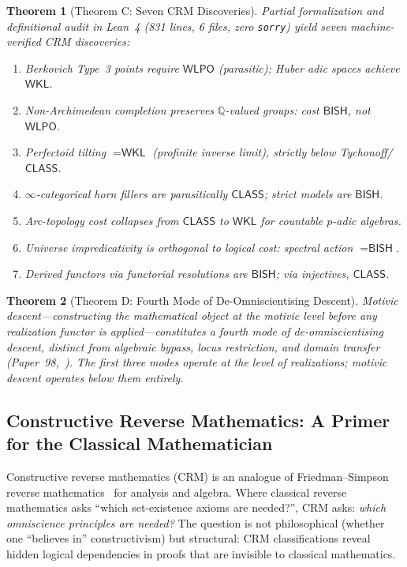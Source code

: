\documentclass[11pt,a4paper]{article}
\theoremstyle{plain}
\newtheorem{theorem}{Theorem}[section]
\theoremstyle{definition}
\newcommand{\BISH}{\textsf{BISH}}
\newcommand{\WKL}{\textsf{WKL}}
\newcommand{\WLPO}{\textsf{WLPO}}
\newcommand{\CLASS}{\textsf{CLASS}}
\newcommand{\Q}{\mathbb{Q}}
\begin{document}
\begin{theorem}[Theorem C: Seven CRM Discoveries]\label{thm:C}
Partial formalization and definitional audit in Lean~4 (831 lines, 6 files, zero \texttt{sorry}) yield seven machine-verified CRM discoveries:
\begin{enumerate}[label=(\arabic*)]
\item Berkovich Type~3 points require $\WLPO$ (parasitic); Huber adic spaces achieve $\WKL$.
\item Non-Archimedean completion preserves $\Q$-valued groups: cost $\BISH$, not $\WLPO$.
\item Perfectoid tilting $= \WKL$ (profinite inverse limit), strictly below Tychonoff/$\CLASS$.
\item $\infty$-categorical horn fillers are parasitically $\CLASS$; strict models are $\BISH$.
\item Arc-topology cost collapses from $\CLASS$ to $\WKL$ for countable $p$-adic algebras.
\item Universe impredicativity is orthogonal to logical cost: spectral action $= \BISH$.
\item Derived functors via functorial resolutions are $\BISH$; via injectives, $\CLASS$.
\end{enumerate}
\end{theorem}

\begin{theorem}[Theorem D: Fourth Mode of De-Omniscientising Descent]\label{thm:D}
Motivic descent---constructing the mathematical object at the motivic level before any realization functor is applied---constitutes a fourth mode of de-omniscientising descent, distinct from algebraic bypass, locus restriction, and domain transfer (Paper~98,~\cite{lee-p98}). The first three modes operate at the level of realizations; motivic descent operates below them entirely.
\end{theorem}

\subsection{Constructive Reverse Mathematics: A Primer for the Classical Mathematician}\label{sec:crm-primer}

Constructive reverse mathematics (CRM) is an analogue of Friedman--Simpson reverse mathematics~\cite{simpson09} for analysis and algebra. Where classical reverse mathematics asks ``which set-existence axioms are needed?'', CRM asks: \emph{which omniscience principles are needed?} The question is not philosophical (whether one ``believes in'' constructivism) but structural: CRM classifications reveal hidden logical dependencies in proofs that are invisible to classical mathematics.
\end{document}
